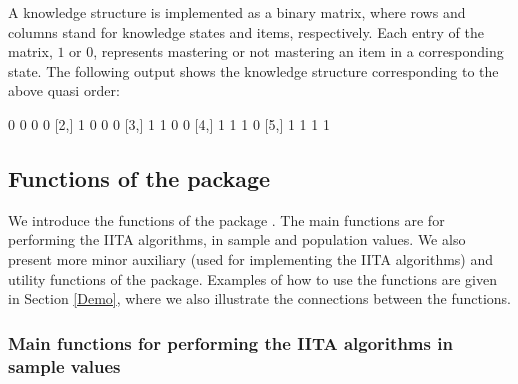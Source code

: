 \documentclass[nojss]{jss}
\begin{document}
A knowledge structure is implemented as a binary matrix, where rows and columns stand for knowledge states and items, respectively. Each entry of the matrix, $1$ or $0$, represents mastering or not mastering an item in a corresponding state. The following  output shows the knowledge structure corresponding to the above quasi order:
\begin{Code}
     [,1] [,2] [,3] [,4]
[1,]    0    0    0    0
[2,]    1    0    0    0
[3,]    1    1    0    0
[4,]    1    1    1    0
[5,]    1    1    1    1
\end{Code} 

\subsection[Functions of the package DAKS]{Functions of the package }
\label{fun}

We introduce the functions of the package . The main functions are for performing 
the IITA algorithms, in sample and population values. We also present more minor auxiliary 
(used for implementing the IITA algorithms) and utility functions of the package.
Examples of how to use the functions are given in Section \ref{Demo}, where we also illustrate 
the connections between the functions.

\subsubsection{Main functions for performing the IITA algorithms in sample values}
\end{document}
